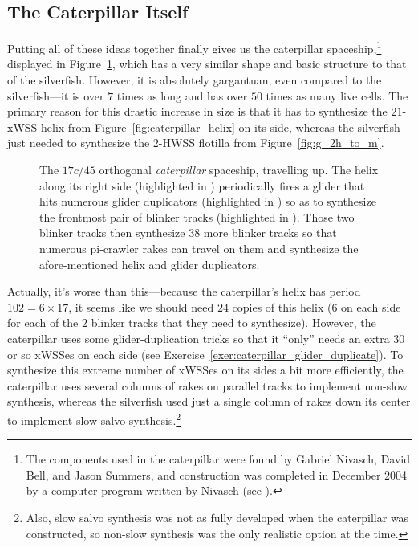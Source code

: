 \subsection{The Caterpillar Itself}\label{sec:caterpillar_itself}

Putting all of these ideas together finally gives us the caterpillar spaceship,\footnote{The components used in the caterpillar were found by Gabriel Nivasch, David Bell, and Jason Summers, and construction was completed in December 2004 by a computer program written by Nivasch (see ).} displayed in Figure~\ref{fig:caterpillar}, which has a very similar shape and basic structure to that of the silverfish. However, it is absolutely gargantuan, even compared to the silverfish---it is over $7$ times as long and has over $50$ times as many live cells. The primary reason for this drastic increase in size is that it has to synthesize the $21$-xWSS helix from Figure~\ref{fig:caterpillar_helix} on its side, whereas the silverfish just needed to synthesize the $2$-HWSS flotilla from Figure~\ref{fig:g_2h_to_m}.

\begin{figure}[!htbp]
	\centering
	\caption{The $17c/45$ orthogonal \emph{caterpillar} spaceship, travelling up. The helix along its right side (highlighted in ) periodically fires a glider that hits numerous glider duplicators (highlighted in ) so as to synthesize the frontmost pair of blinker tracks (highlighted in ). Those two blinker tracks then synthesize $38$ more blinker tracks so that numerous pi-crawler rakes can travel on them and synthesize the afore-mentioned helix and glider duplicators.}\label{fig:caterpillar}
\end{figure}

Actually, it's worse than this---because the caterpillar's helix has period $102 = 6 \times 17$, it seems like we should need $24$ copies of this helix ($6$ on each side for each of the $2$ blinker tracks that they need to synthesize). However, the caterpillar uses some glider-duplication tricks so that it ``only'' needs an extra 30 or so xWSSes on each side (see Exercise~\ref{exer:caterpillar_glider_duplicate}). To synthesize this extreme number of xWSSes on its sides a bit more efficiently, the caterpillar uses several columns of rakes on parallel tracks to implement non-slow synthesis, whereas the silverfish used just a single column of rakes down its center to implement slow salvo synthesis.\footnote{Also, slow salvo synthesis was not as fully developed when the caterpillar was constructed, so non-slow synthesis was the only realistic option at the time.}


